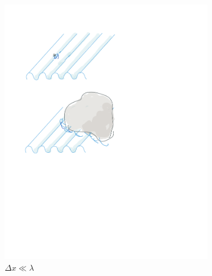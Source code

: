 \documentclass[12pt, oneside]{report}    %
\begin{document}
\begin{figure}%
    \centering
    \begin{subfigure}{0.3\textwidth}
    \centering
        \includegraphics[width=\linewidth]{figures/waves_small.pdf}
        \caption{$\Delta x \ll \lambda$}
        \label{fig:subfig:waves:small}
    \end{subfigure}\;%
    \begin{subfigure}{0.3\textwidth}
    \centering

\end{subfigure}
\end{figure}
\end{document}
